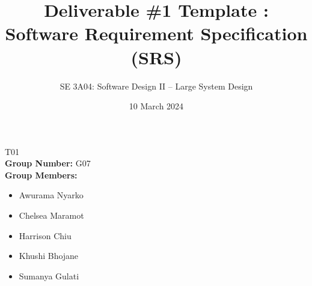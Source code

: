 \documentclass[]{article}
\title{Deliverable \#1 Template : Software Requirement Specification (SRS)}
\author{SE 3A04: Software Design II -- Large System Design}
\date{10 March 2024}
\begin{document}
\maketitle
{} T01\\
{\bf Group Number:} G07 \\
{\bf Group Members:}
\begin{itemize}
	\item Awurama Nyarko
	\item Chelsea Maramot
	\item Harrison Chiu
	\item Khushi Bhojane
	\item Sumanya Gulati
\end{itemize}

\end{document}
